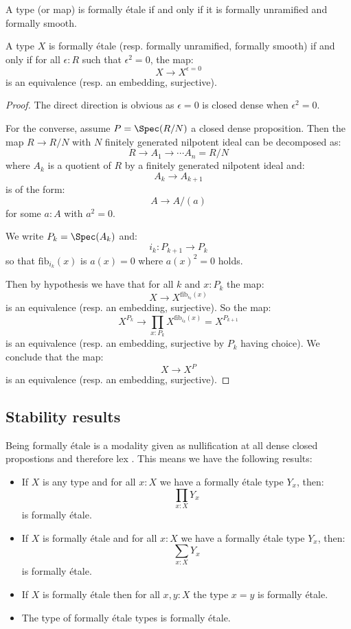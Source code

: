 \begin{remark}
A type (or map) is formally étale if and only if it is formally unramified and formally smooth.
\end{remark}

\begin{lemma}
A type $X$ is formally étale (resp. formally unramified, formally smooth) if and only if for all $\epsilon:R$ such that $\epsilon^2=0$, the map:
\[X\to X^{\epsilon=0}\]
is an equivalence (resp. an embedding, surjective).
\end{lemma}

\begin{proof}
The direct direction is obvious as $\epsilon=0$ is closed dense when $\epsilon^2=0$.

For the converse, assume $P=\Spec(R/N)$ a closed dense proposition. Then the map $R\to R/N$ with $N$ finitely generated nilpotent ideal can be decomposed as:
\[R\to A_1\to \cdots A_n = R/N\]
where $A_k$ is a quotient of $R$ by a finitely generated nilpotent ideal and:
\[A_k\to A_{k+1}\]
is of the form:
\[A\to A/(a)\]
for some $a:A$ with $a^2=0$.

We write $P_k = \Spec(A_k)$ and:
\[i_k:P_{k+1}\to P_k\] 
so that $\mathrm{fib}_{i_k}(x)$ is $a(x)=0$ where $a(x)^2=0$ holds.

Then by hypothesis we have that for all $k$ and $x:P_{k}$ the map:
\[X\to X^{\mathrm{fib}_{i_k}(x)}\]
is an equivalence (resp. an embedding, surjective). So the map:
\[X^{P_{k}} \to \prod_{x:P_{k}}X^{\mathrm{fib}_{i_k}(x)} = X^{P_{k+1}}\]
is an equivalence (resp. an embedding, surjective by $P_{k}$ having choice).
We conclude that the map:
\[X\to X^P\]
is an equivalence (resp. an embedding, surjective).
\end{proof}



\subsection{Stability results}

Being formally étale is a modality given as nullification at all dense closed propostions and therefore lex \cite[Corollary 3.12]{modalities}.
This means we have the following results:

\begin{proposition}
\begin{itemize}
\item If $X$ is any type and for all $x:X$ we have a formally étale type $Y_x$, then:
\[\prod_{x:X}Y_x\]
is formally étale. 
\item  If $X$ is formally étale and for all $x:X$ we have a formally étale type $Y_x$, then:
\[\sum_{x:X}Y_x\]
is formally étale. 
\item If $X$ is formally étale then for all $x,y : X$ the type $x=y$ is formally étale.
\item The type of formally étale types is formally étale.
\end{itemize}
\end{proposition}


